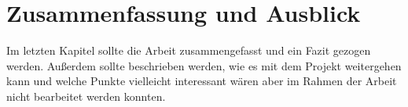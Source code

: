 \chapter{Zusammenfassung und Ausblick}
Im letzten Kapitel sollte die Arbeit zusammengefasst und ein Fazit gezogen werden. Außerdem sollte beschrieben werden, wie es mit dem Projekt weitergehen kann und welche Punkte vielleicht interessant wären aber im Rahmen der Arbeit nicht bearbeitet werden konnten.
